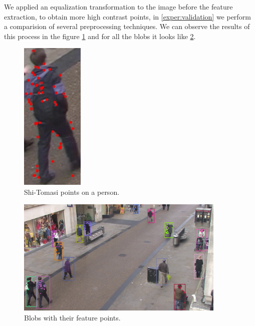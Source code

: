 We applied an equalization transformation to the image before the feature extraction, to obtain more high contrast points, in \ref{exper:validation} we perform a comparision of several preprocessing techniques. We can observe the results of this process in the figure \ref{solution2} and for all the blobs it looks like \ref{solution3}.


\begin{figure}[H]
\centering         
\includegraphics[width=3cm]{implementation/pointsEQU.jpg}
\caption{Shi-Tomasi points on a person.} \label{solution2}
\end{figure}

%


\begin{figure}[H]
\centering         
\includegraphics[width=10cm]{intro/pounts.jpg}
\caption{Blobs with their feature points.} \label{solution3}
\end{figure}


